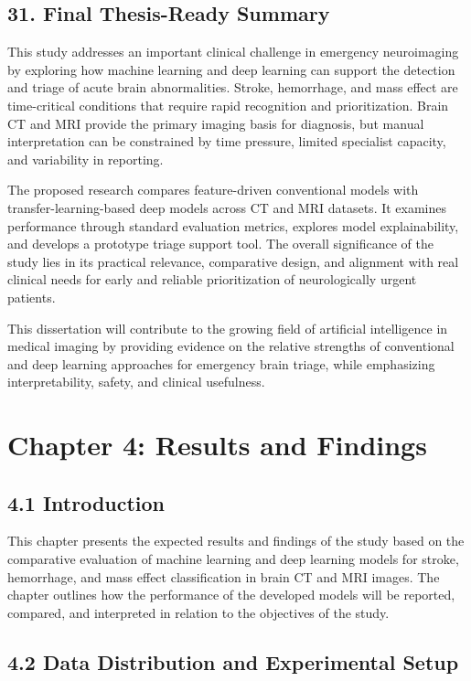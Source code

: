 \documentclass[12pt,a4paper]{report}
\begin{document}
\section{31. Final Thesis-Ready Summary}

This study addresses an important clinical challenge in emergency neuroimaging by exploring how machine learning and deep learning can support the detection and triage of acute brain abnormalities. Stroke, hemorrhage, and mass effect are time-critical conditions that require rapid recognition and prioritization. Brain CT and MRI provide the primary imaging basis for diagnosis, but manual interpretation can be constrained by time pressure, limited specialist capacity, and variability in reporting.

The proposed research compares feature-driven conventional models with transfer-learning-based deep models across CT and MRI datasets. It examines performance through standard evaluation metrics, explores model explainability, and develops a prototype triage support tool. The overall significance of the study lies in its practical relevance, comparative design, and alignment with real clinical needs for early and reliable prioritization of neurologically urgent patients.

This dissertation will contribute to the growing field of artificial intelligence in medical imaging by providing evidence on the relative strengths of conventional and deep learning approaches for emergency brain triage, while emphasizing interpretability, safety, and clinical usefulness.
\chapter{Chapter 4: Results and Findings}

\section{4.1 Introduction}

This chapter presents the expected results and findings of the study based on the comparative evaluation of machine learning and deep learning models for stroke, hemorrhage, and mass effect classification in brain CT and MRI images. The chapter outlines how the performance of the developed models will be reported, compared, and interpreted in relation to the objectives of the study.

\section{4.2 Data Distribution and Experimental Setup}
\end{document}
